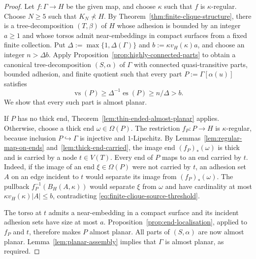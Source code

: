 \documentclass[a4paper]{amsart}
\begin{document}
\begin{proof}
Let $f:\Gamma\to H$ be the given map, and choose $\kappa$ such that $f$ is $\kappa$-regular.
Choose $N\geq5$ such that $K_N\nprec H$.
By Theorem~\ref{thm:finite-clique-structure}, there is a tree-decomposition $(T,\beta)$ of $H$ whose adhesion is bounded by an integer $a\geq1$ and whose torsos admit near-embeddings in compact surfaces from a fixed finite collection.
Put $\Delta:=\max\{1,\Delta(\Gamma)\}$ and $b:=\kappa v_H(\kappa)a$, and choose an integer $n>\Delta b$.
Apply Proposition~\ref{prop:highly-connected-parts} to obtain a canonical tree-decomposition $(S,\alpha)$ of $\Gamma$ with connected quasi-transitive parts, bounded adhesion, and finite quotient such that every part $P:=\Gamma[\alpha(u)]$ satisfies
\begin{equation}\label{eq:finite-clique-source-threshold}
\operatorname{vs}(P)\geq\Delta^{-1}\operatorname{es}(P)\geq n/\Delta>b.
\end{equation}
We show that every such part is almost planar.

If $P$ has no thick end, Theorem~\ref{lem:thin-ended-almost-planar} applies.
Otherwise, choose a thick end $\omega\in\Omega(P)$.
The restriction $f_P:P\to H$ is $\kappa$-regular, because inclusion $P\hookrightarrow\Gamma$ is injective and $1$-Lipschitz.
By Lemmas~\ref{lem:regular-map-on-ends} and~\ref{lem:thick-end-carried}, the image end $(f_P)_*(\omega)$ is thick and is carried by a node $t\in V(T)$.
Every end of $P$ maps to an end carried by $t$.
Indeed, if the image of an end $\xi\in\Omega(P)$ were not carried by $t$, an adhesion set $A$ on an edge incident to $t$ would separate its image from $(f_P)_*(\omega)$.
The pullback $f_P^{-1}(B_H(A,\kappa))$ would separate $\xi$ from $\omega$ and have cardinality at most $\kappa v_H(\kappa)|A|\leq b$, contradicting \eqref{eq:finite-clique-source-threshold}.

The torso at $t$ admits a near-embedding in a compact surface and its incident adhesion sets have size at most $a$.
Proposition~\ref{prop:end-localisation}, applied to $f_P$ and $t$, therefore makes $P$ almost planar.
All parts of $(S,\alpha)$ are now almost planar.
Lemma~\ref{lem:planar-assembly} implies that $\Gamma$ is almost planar, as required.
\end{proof}




\end{document}
